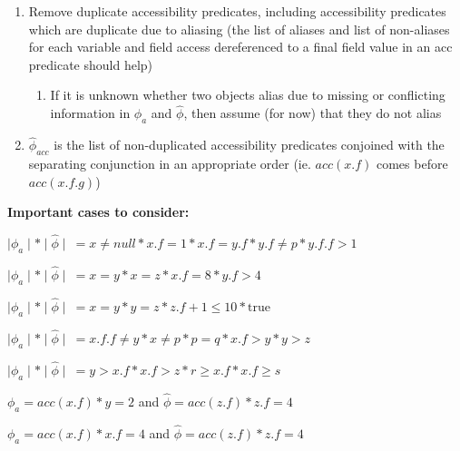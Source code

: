 \documentclass {article}
\newcommand{\true}{\text{true}}
\newcommand{\fphi}{\widehat{\phi}}
\begin{document}
\begin{enumerate}
\item Remove duplicate accessibility predicates, including accessibility predicates which are duplicate due to aliasing (the list of aliases and list of non-aliases for each variable and field access dereferenced to a final field value in an acc predicate should help)
	\begin{enumerate}
	\item If it is unknown whether two objects alias due to missing or conflicting information in $\phi_a$ and $\fphi$, then assume (for now) that they do not alias
	\end{enumerate}
\item $\fphi_{acc}$ is the list of non-duplicated accessibility predicates conjoined with the separating conjunction in an appropriate order (ie. $acc(x.f)$ comes before $acc(x.f.g)$)
\end{enumerate}

\textbf{Important cases to consider:}

$\mid \phi_a \mid \ast \mid \fphi \mid \ = x \neq null \ast x.f = 1 \ast x.f = y.f \ast y.f \neq p \ast y.f.f > 1$

$\mid \phi_a \mid \ast \mid \fphi \mid \ = x = y \ast x = z \ast x.f = 8 \ast y.f > 4$

$\mid \phi_a \mid \ast \mid \fphi \mid \ = x = y \ast y = z \ast z.f + 1 \leq 10 \ast \true$

$\mid \phi_a \mid \ast \mid \fphi \mid \ = x.f.f \neq y \ast x \neq p \ast p = q \ast x.f > y \ast y > z$

$\mid \phi_a \mid \ast \mid \fphi \mid \ = y > x.f \ast x.f > z \ast r \geq x.f \ast x.f \geq s$

$\phi_a = acc(x.f) \ast y = 2$ and $\fphi = acc(z.f) \ast z.f = 4$

$\phi_a = acc(x.f) \ast x.f = 4$ and $\fphi = acc(z.f) \ast z.f = 4$
\end{document}
